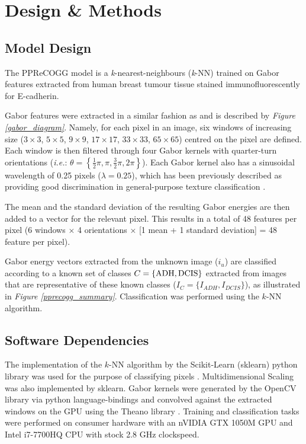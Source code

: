 \section{Design \& Methods}
\subsection{Model Design}
The PPReCOGG model is a \emph{k}-nearest-neighbours (\emph{k}-NN) trained on Gabor features extracted from human breast tumour tissue stained immunofluorescently for E-cadherin.\par

Gabor features were extracted in a similar fashion as \cite{melendez2008} and is described by \emph{Figure \ref{gabor_diagram}}. Namely, for each 
pixel in an image, six windows of increasing size ($3\times3$, $5\times5$, $9\times9$, 
$17\times17$, $33\times33$, $65\times65$) centred on the pixel are defined. 
Each window is then filtered through four Gabor kernels with quarter-turn 
orientations (\emph{i.e.}: $\theta = \left\{\frac{1}{2}\pi, \pi, \frac{3}{2}\pi, 
2\pi \right\}$). Each Gabor kernel also has a sinusoidal wavelength of 0.25 pixels 
($\lambda = 0.25$), which has been previously described as providing good 
discrimination in general-purpose texture classification \citep{manjunath1996}.\par

The mean and the standard deviation of the resulting Gabor energies are then
added to a vector for the relevant pixel. This results in a total of 48 features
per pixel (6 windows $\times$ 4 orientations $\times$ [1 mean + 1 standard deviation] = 48
feature per pixel).\par

Gabor energy vectors extracted from the unknown image ($i_u$) are classified according to a known set of classes $C = \{\textnormal{ADH}, \textnormal{DCIS}\}$ extracted from images that are representative of these known classes ($I_C = \{I_{ADH}, I_{DCIS}\}$), as illustrated in \emph{Figure \ref{pprecogg_summary}}. Classification was performed using the $k$-NN algorithm.

\subsection{Software Dependencies}
 The implementation of the $k$-NN algorithm by the Scikit-Learn (sklearn) python library was used for the purpose of classifying pixels \citep{pedregosa2011}. Multidimensional Scaling was also implemented by sklearn. Gabor kernels were generated by the OpenCV library via python language-bindings \citep{opencv_library} and convolved against the extracted windows on the GPU using the Theano library \citep{alrfou2016}. Training and classification tasks were performed on consumer hardware with an nVIDIA GTX 1050M GPU and Intel i7-7700HQ CPU with stock 2.8 GHz clockspeed.\par

